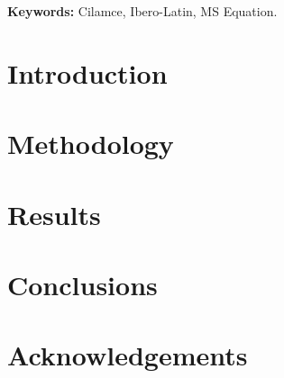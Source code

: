 \documentclass{cilamce19}
\begin{document}
\textbf{Keywords:} Cilamce, Ibero-Latin, MS Equation.

\pagebreak




\section{Introduction}
   \lipsum[1]\citet{book-example}


\section{Methodology}

 \lipsum[2-4]\citet{article-example}


\section{Results}
\lipsum[6-7]\citet{inbook-example}

\section{Conclusions}
\lipsum[8-11]

\section{Acknowledgements}
\lipsum[12]

%
  
  
\end{document}
